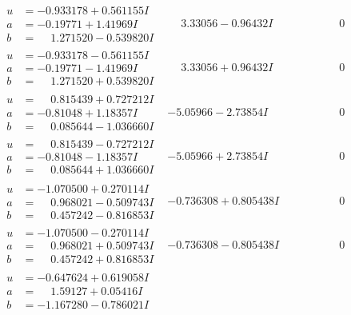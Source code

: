 \documentclass[1p]{elsarticle_modified}
\theoremstyle{definition}
\begin{document}
$$\begin{array}{c|c|c}
\begin{aligned}
u &= -0.933178 + 0.561155 I \\
a &= -0.19771 + 1.41969 I \\
b &= \phantom{-}1.271520 - 0.539820 I\end{aligned}
 & \phantom{-}3.33056 - 0.96432 I & \phantom{-0.000000 } 0 \\ \hline\begin{aligned}
u &= -0.933178 - 0.561155 I \\
a &= -0.19771 - 1.41969 I \\
b &= \phantom{-}1.271520 + 0.539820 I\end{aligned}
 & \phantom{-}3.33056 + 0.96432 I & \phantom{-0.000000 } 0 \\ \hline\begin{aligned}
u &= \phantom{-}0.815439 + 0.727212 I \\
a &= -0.81048 + 1.18357 I \\
b &= \phantom{-}0.085644 - 1.036660 I\end{aligned}
 & -5.05966 - 2.73854 I & \phantom{-0.000000 } 0 \\ \hline\begin{aligned}
u &= \phantom{-}0.815439 - 0.727212 I \\
a &= -0.81048 - 1.18357 I \\
b &= \phantom{-}0.085644 + 1.036660 I\end{aligned}
 & -5.05966 + 2.73854 I & \phantom{-0.000000 } 0 \\ \hline\begin{aligned}
u &= -1.070500 + 0.270114 I \\
a &= \phantom{-}0.968021 - 0.509743 I \\
b &= \phantom{-}0.457242 - 0.816853 I\end{aligned}
 & -0.736308 + 0.805438 I & \phantom{-0.000000 } 0 \\ \hline\begin{aligned}
u &= -1.070500 - 0.270114 I \\
a &= \phantom{-}0.968021 + 0.509743 I \\
b &= \phantom{-}0.457242 + 0.816853 I\end{aligned}
 & -0.736308 - 0.805438 I & \phantom{-0.000000 } 0 \\ \hline\begin{aligned}
u &= -0.647624 + 0.619058 I \\
a &= \phantom{-}1.59127 + 0.05416 I \\
b &= -1.167280 - 0.786021 I\end{aligned}

\end{array}$$
\end{document}
